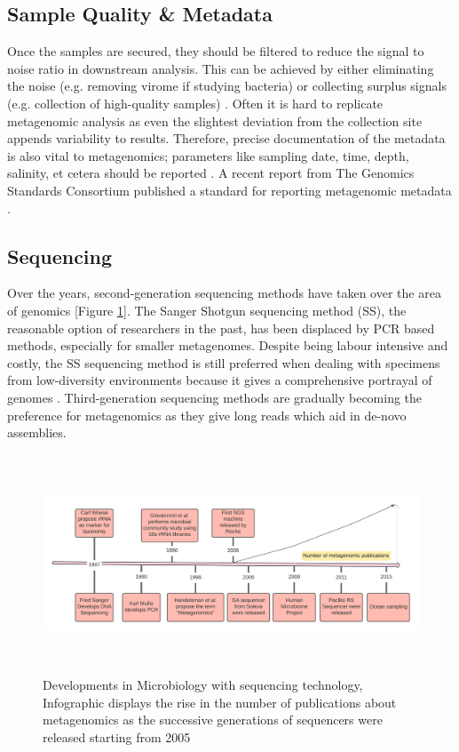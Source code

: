 \subsection{Sample Quality \& Metadata}
Once the samples are secured, they should be filtered to reduce the signal to noise ratio in downstream analysis. This can be achieved by either eliminating the noise (e.g. removing virome if studying bacteria) or collecting surplus signals (e.g. collection of high-quality samples) \cite{ref12}. Often it is hard to replicate metagenomic analysis as even the slightest deviation from the collection site appends variability to results. Therefore, precise documentation of the metadata is also vital to metagenomics; parameters like sampling date, time, depth, salinity, et cetera should be reported \cite{ref12}. A recent report from The Genomics Standards Consortium published a standard for reporting metagenomic metadata \cite{ref12}.

\subsection{Sequencing}
Over the years, second-generation sequencing methods have taken over the area of genomics [Figure \ref{fig:figure2}]. The Sanger Shotgun sequencing method (SS), the reasonable option of researchers in the past, has been displaced by PCR based methods, especially for smaller metagenomes. Despite being labour intensive and costly, the SS sequencing method is still preferred when dealing with specimens from low-diversity environments because it gives a comprehensive portrayal of genomes \cite{ref12}. Third-generation sequencing methods are gradually becoming the preference for metagenomics as they give long reads which aid in de-novo assemblies.

\begin{figure}
  \centering
  \includegraphics[width=15cm, height=6.5cm]{../figures/Figure2.png}
  \caption{Developments in Microbiology with sequencing technology, Infographic displays the rise in the number of publications about metagenomics as the successive generations of sequencers were released starting from 2005 \cite{ref11}}
  \label{fig:figure2}
\end{figure}

